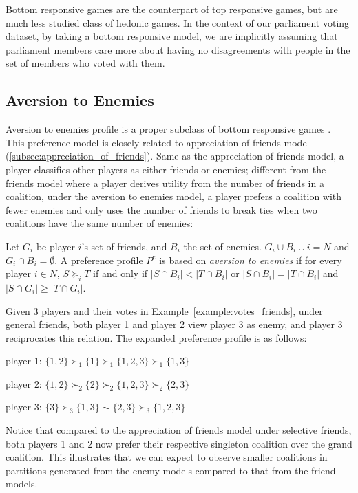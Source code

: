 Bottom responsive games are the counterpart of top responsive games, but are
much less studied class of hedonic games.
In the context of our parliament voting dataset, by taking a bottom responsive
model, we are implicitly assuming that parliament members care more about having
no disagreements with people in the set of members who voted with them.

\subsection{Aversion to Enemies}
\label{subsec:aversion_to_enemies}

Aversion to enemies profile is a proper subclass of bottom responsive games
\cite{SuSu10}.
This preference model is closely related to appreciation of friends model
(\autoref{subsec:appreciation_of_friends}).
Same as the appreciation of friends model, a player classifies other players as
either friends or enemies; different from the friends model where a player
derives utility from the number of friends in a coalition, under the aversion
to enemies model, a player prefers a coalition with fewer enemies and only uses
the number of friends to break ties when two coalitions have the same number
of enemies:

Let $G_i$ be player $i$'s set of friends, and $B_i$ the set of enemies.
$G_i \cup B_i \cup i = N$ and $G_i \cap B_i = \emptyset$.
A preference profile $P^e$ is based on \textit{aversion to enemies} if for every
player $i \in N$, $S \succeq_i T$ if and only if $|S \cap B_i| < |T \cap B_i|$
or $|S \cap B_i| = |T \cap B_i|$ and $|S \cap G_i| \geq |T \cap G_i|$.

Given 3 players and their votes in Example~\ref{example:votes_friends},
under general friends, both player 1 and player 2 view player 3 as enemy, and
player 3 reciprocates this relation.
The expanded preference profile is as follows:

player 1: $\{1, 2\} \succ_1 \{1\} \succ_1 \{1, 2, 3\} \succ_1 \{1, 3\} $

player 2: $\{1, 2\} \succ_2 \{2\} \succ_2 \{1, 2, 3\} \succ_2 \{2, 3\}$

player 3: $\{3\} \succ_3 \{1, 3\} \sim \{2, 3\} \succ_3 \{1, 2, 3\}$

Notice that compared to the appreciation of friends model under selective
friends, both players 1 and 2 now prefer their respective singleton coalition
over the grand coalition.
This illustrates that we can expect to observe smaller coalitions in partitions
generated from the enemy models compared to that from the friend models.

